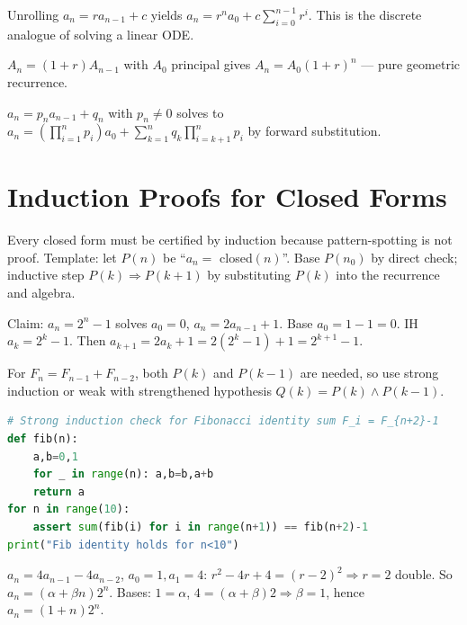 \begin{theorem}
Unrolling $a_n=r a_{n-1}+c$ yields $a_n=r^n a_0+c\sum_{i=0}^{n-1}r^i$. This is the discrete analogue of solving a linear ODE.
\end{theorem}

\begin{example}
$A_n=(1+r)A_{n-1}$ with $A_0$ principal gives $A_n=A_0(1+r)^n$ --- pure geometric recurrence.
\end{example}

\begin{theorem}
$a_n=p_n a_{n-1}+q_n$ with $p_n\neq0$ solves to $a_n=\left(\prod_{i=1}^{n}p_i\right)a_0+\sum_{k=1}^{n}q_k\prod_{i=k+1}^{n}p_i$ by forward substitution.
\end{theorem}

\section{Induction Proofs for Closed Forms}
\label{sec:induction-recurrence}
Every closed form must be certified by induction because pattern-spotting is not proof. Template: let $P(n)$ be ``$a_n=$ closed$(n)$''. Base $P(n_0)$ by direct check; inductive step $P(k)\Rightarrow P(k+1)$ by substituting $P(k)$ into the recurrence and algebra.

\begin{example}
Claim: $a_n=2^n-1$ solves $a_0=0$, $a_n=2a_{n-1}+1$. Base $a_0=1-1=0$. IH $a_k=2^k-1$. Then $a_{k+1}=2a_k+1=2(2^k-1)+1=2^{k+1}-1$.
\end{example}

\begin{remark}
For $F_n=F_{n-1}+F_{n-2}$, both $P(k)$ and $P(k-1)$ are needed, so use strong induction or weak with strengthened hypothesis $Q(k)=P(k)\land P(k-1)$.
\end{remark}

\begin{lstlisting}[language=Python]
# Strong induction check for Fibonacci identity sum F_i = F_{n+2}-1
def fib(n):
    a,b=0,1
    for _ in range(n): a,b=b,a+b
    return a
for n in range(10):
    assert sum(fib(i) for i in range(n+1)) == fib(n+2)-1
print("Fib identity holds for n<10")
\end{lstlisting}


\begin{example}
$a_n=4a_{n-1}-4a_{n-2}$, $a_0=1,a_1=4$: $r^2-4r+4=(r-2)^2\Rightarrow r=2$ double. So $a_n=(\alpha+\beta n)2^n$. Bases: $1=\alpha$, $4=(\alpha+\beta)2\Rightarrow\beta=1$, hence $a_n=(1+n)2^n$.
\end{example}

